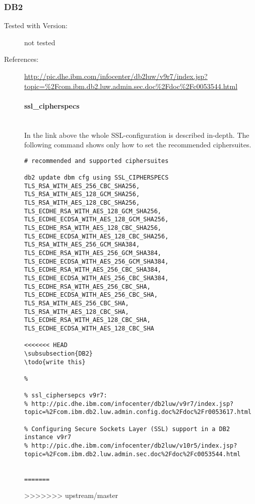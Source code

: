 \subsubsection{DB2}
\begin{description}
\item[Tested with Version:] not tested

\item[References:]
{\small \url{http://pic.dhe.ibm.com/infocenter/db2luw/v9r7/index.jsp?topic=%2Fcom.ibm.db2.luw.admin.sec.doc%2Fdoc%2Fc0053544.html}}


\paragraph*{ssl\_cipherspecs}\mbox{}\\
In the link above the whole SSL-configuration is described in-depth. The following command shows only how to set the recommended ciphersuites.
\begin{lstlisting}[breaklines]
# recommended and supported ciphersuites 

db2 update dbm cfg using SSL_CIPHERSPECS 
TLS_RSA_WITH_AES_256_CBC_SHA256,
TLS_RSA_WITH_AES_128_GCM_SHA256,
TLS_RSA_WITH_AES_128_CBC_SHA256,
TLS_ECDHE_RSA_WITH_AES_128_GCM_SHA256,
TLS_ECDHE_ECDSA_WITH_AES_128_GCM_SHA256,
TLS_ECDHE_RSA_WITH_AES_128_CBC_SHA256,
TLS_ECDHE_ECDSA_WITH_AES_128_CBC_SHA256,
TLS_RSA_WITH_AES_256_GCM_SHA384,
TLS_ECDHE_RSA_WITH_AES_256_GCM_SHA384,
TLS_ECDHE_ECDSA_WITH_AES_256_GCM_SHA384,
TLS_ECDHE_RSA_WITH_AES_256_CBC_SHA384,
TLS_ECDHE_ECDSA_WITH_AES_256_CBC_SHA384,
TLS_ECDHE_RSA_WITH_AES_256_CBC_SHA,
TLS_ECDHE_ECDSA_WITH_AES_256_CBC_SHA,
TLS_RSA_WITH_AES_256_CBC_SHA,
TLS_RSA_WITH_AES_128_CBC_SHA,
TLS_ECDHE_RSA_WITH_AES_128_CBC_SHA,
TLS_ECDHE_ECDSA_WITH_AES_128_CBC_SHA

<<<<<<< HEAD
\subsubsection{DB2}
\todo{write this}

% 

% ssl_ciphersepcs v9r7:
% http://pic.dhe.ibm.com/infocenter/db2luw/v9r7/index.jsp?topic=%2Fcom.ibm.db2.luw.admin.config.doc%2Fdoc%2Fr0053617.html

% Configuring Secure Sockets Layer (SSL) support in a DB2 instance v9r7
% http://pic.dhe.ibm.com/infocenter/db2luw/v10r5/index.jsp?topic=%2Fcom.ibm.db2.luw.admin.sec.doc%2Fdoc%2Fc0053544.html


=======
\end{lstlisting}
>>>>>>> upstream/master

\end{description}

